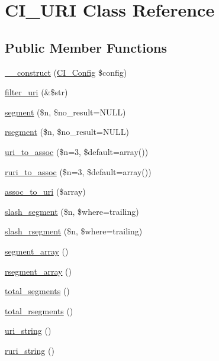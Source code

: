 \hypertarget{class_c_i___u_r_i}{}\section{C\+I\+\_\+\+U\+RI Class Reference}
\label{class_c_i___u_r_i}
\subsection*{Public Member Functions}
\begin{DoxyCompactItemize}
\item 
\mbox{\hyperlink{class_c_i___u_r_i_ab7da97fbbffcd188093b4674ef948335}{\+\_\+\+\_\+construct}} (\mbox{\hyperlink{class_c_i___config}{C\+I\+\_\+\+Config}} \$config)
\item 
\mbox{\hyperlink{class_c_i___u_r_i_a0449aea4e186717ecbf1eacfc59fc5b6}{filter\+\_\+uri}} (\&\$str)
\item 
\mbox{\hyperlink{class_c_i___u_r_i_aeea297fbd38079886a2de35d633c1ed5}{segment}} (\$n, \$no\+\_\+result=N\+U\+LL)
\item 
\mbox{\hyperlink{class_c_i___u_r_i_a0fbd875ee8f8965b0b495b1dce0080fb}{rsegment}} (\$n, \$no\+\_\+result=N\+U\+LL)
\item 
\mbox{\hyperlink{class_c_i___u_r_i_a67cca74de71898ee88c167a265cff140}{uri\+\_\+to\+\_\+assoc}} (\$n=3, \$default=array())
\item 
\mbox{\hyperlink{class_c_i___u_r_i_a3f375a2026349f1fce7915966eba6d5b}{ruri\+\_\+to\+\_\+assoc}} (\$n=3, \$default=array())
\item 
\mbox{\hyperlink{class_c_i___u_r_i_a5c17149885c92fef1ed7f191f14a3f4d}{assoc\+\_\+to\+\_\+uri}} (\$array)
\item 
\mbox{\hyperlink{class_c_i___u_r_i_ac0b17861bb5ec6faf59d1157b9b60131}{slash\+\_\+segment}} (\$n, \$where=\textquotesingle{}trailing\textquotesingle{})
\item 
\mbox{\hyperlink{class_c_i___u_r_i_abeb00696116ba389fe26f3e49fd69ed5}{slash\+\_\+rsegment}} (\$n, \$where=\textquotesingle{}trailing\textquotesingle{})
\item 
\mbox{\hyperlink{class_c_i___u_r_i_ac0db37475b7a41e156f2e9375a2b7cc6}{segment\+\_\+array}} ()
\item 
\mbox{\hyperlink{class_c_i___u_r_i_aaac2da0a6641a4a874a178442eb99624}{rsegment\+\_\+array}} ()
\item 
\mbox{\hyperlink{class_c_i___u_r_i_a5805c40e1c916e7b00b49f131765ac1c}{total\+\_\+segments}} ()
\item 
\mbox{\hyperlink{class_c_i___u_r_i_aead39329dc096b94eef0955fdcdd635f}{total\+\_\+rsegments}} ()
\item 
\mbox{\hyperlink{class_c_i___u_r_i_ac7a3f945c14cc37f89b6d9d1c7a037a4}{uri\+\_\+string}} ()
\item 
\mbox{\hyperlink{class_c_i___u_r_i_a53a97a8b68f500980b84e3b060400221}{ruri\+\_\+string}} ()
\end{DoxyCompactItemize}

